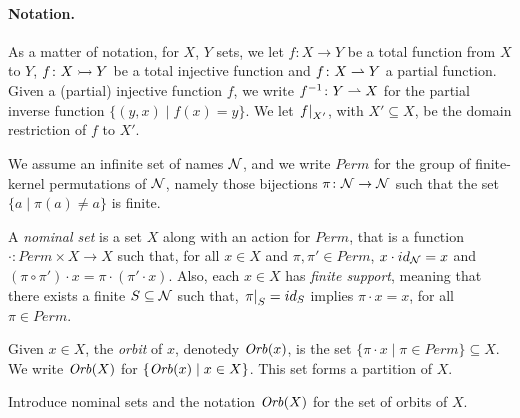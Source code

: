 \paragraph{Notation.} As a matter of notation, for $X$, $Y$ sets, we let $f \colon X \to Y$ be a total function from $X$ to $Y$, $f \colon X \rightarrowtail Y$ be a total injective function and $f \colon X \rightharpoonup Y$ a partial function. Given a (partial) injective function $f$, we write $f^{-1} \colon Y \rightharpoonup X$ for the partial inverse function $\{(y,x) \mid f(x) = y \}$. We let $\left.f\right|_{X'}$, with $X' \subseteq X$, be the domain restriction of $f$ to $X'$.

We assume an infinite set of names $\mathcal{N}$, and we write $Perm$ for the group of finite-kernel permutations of $\mathcal{N}$, namely those bijections $\pi \colon \mathcal{N} \to \mathcal{N}$ such that the set $\{ a \mid \pi(a) \neq a \}$ is finite.
\begin{definition}
A \emph{nominal set} is a set $X$ along with an action for $Perm$, that is a function $\cdot \colon Perm \times X \to X$ such that, for all $x \in X$ and $\pi,\pi' \in Perm$, $x \cdot id_{\mathcal{N}} = x$ and $(\pi \circ \pi') \cdot x = \pi \cdot (\pi' \cdot x)$. Also, each $x \in X$ has \emph{finite support}, meaning that there exists a finite $S \subseteq \mathcal{N}$ such that, $\left.\pi\right|_{S} = id_S$ implies $\pi \cdot x = x$, for all $\pi \in Perm$.
\end{definition}
%
Given $x \in X$, the \emph{orbit} of $x$, denotedy $\mathit{Orb}(x) $, is the set $\{ \pi \cdot x \mid \pi \in Perm\} \subseteq X$. We write $\mathit{Orb}(X)$ for $\{ \mathit{Orb}(x) \mid x \in X\}$. This set forms a partition of $X$. 
\begin{Todo}
 Introduce nominal sets and the notation $\mathit{Orb}(X)$ for the set of orbits of $X$.
\end{Todo}
